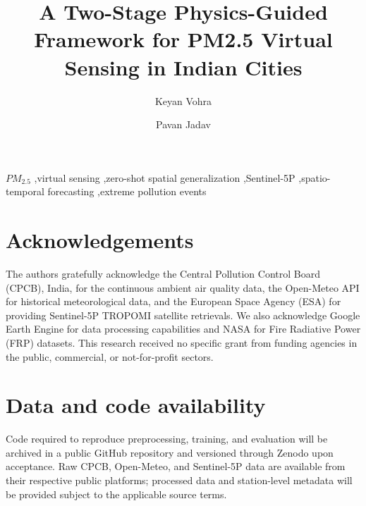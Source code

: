 \documentclass[preprint,12pt]{elsarticle}
\begin{document}
\begin{frontmatter}

\title{A Two-Stage Physics-Guided Framework for PM2.5 Virtual Sensing in Indian Cities}

\author[1]{Keyan Vohra}

\author[1]{Pavan Jadav}

\address[1]{Computer Engineering Department, Government Engineering College, Bharuch, Gujarat, India}


\begin{abstract}

\end{abstract}

\begin{keyword}
$PM_{2.5}$ \sep virtual sensing \sep zero-shot spatial generalization \sep Sentinel-5P \sep spatio-temporal forecasting \sep extreme pollution events
\end{keyword}

\end{frontmatter}







\section*{Acknowledgements}
The authors gratefully acknowledge the Central Pollution Control Board (CPCB), India, for the continuous ambient air quality data, the Open-Meteo API for historical meteorological data, and the European Space Agency (ESA) for providing Sentinel-5P TROPOMI satellite retrievals. We also acknowledge Google Earth Engine for data processing capabilities and NASA for Fire Radiative Power (FRP) datasets. This research received no specific grant from funding agencies in the public, commercial, or not-for-profit sectors.

\section*{Data and code availability}
Code required to reproduce preprocessing, training, and evaluation will be archived in a public GitHub repository and versioned through Zenodo upon acceptance. Raw CPCB, Open-Meteo, and Sentinel-5P data are available from their respective public platforms; processed data and station-level metadata will be provided subject to the applicable source terms.

\nocite{*}


\end{document}
